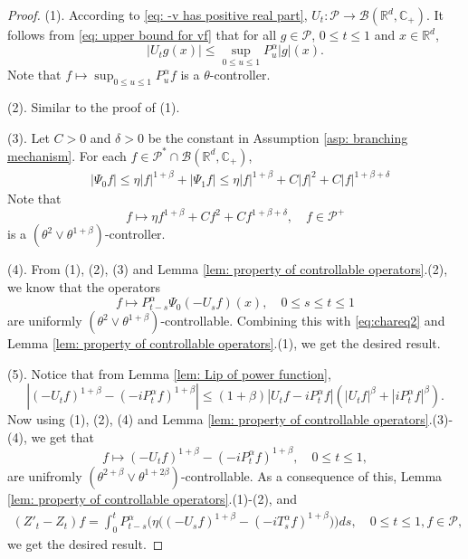 \documentclass[12pt,a4paper]{amsart}
\theoremstyle{plain}
\theoremstyle{definition}
\numberwithin{equation}{section}
\begin{document}
\begin{proof}
    (1). According to \eqref{eq: -v has positive real part}, $U_t: \mathcal P \to \mathcal B(\mathbb R^d, \mathbb C_+)$.
    It follows from \eqref{eq: upper bound for vf} that for all $g\in \mathcal P$, $0\leq t\leq 1$ and $x\in \mathbb R^d$,
\[
    |U_t g(x)|
    \leq \sup_{0\leq u\leq 1}P_u^\alpha |g| (x).
\]
    Note that $f\mapsto\sup_{0\leq u\leq 1}P^{\alpha}_u f$ is a $\theta$-controller.

    (2). Similar to the proof of (1).

    (3). Let $C>0$ and $\delta > 0$ be the constant in Assumption \ref{asp: branching mechanism}.
    For each $f\in \mathcal P^* \cap \mathcal B(\mathbb R^d, \mathbb C_+)$,
\begin{equation}\begin{split}
    &|\Psi_0 f|
    \leq \eta |f|^{1+\beta} + |\Psi_1 f|
    \leq \eta |f|^{1+\beta} + C|f|^2+ C|f|^{1+\beta + \delta}
\end{split}\end{equation}
    Note that
\[
    f \mapsto \eta f^{1+\beta} + Cf^2+ Cf^{1+\beta + \delta},\quad f\in \mathcal P^+
\]
     is a $(\theta^2 \vee \theta^{1+\beta})$-controller.

    (4). From (1), (2), (3) and Lemma \ref{lem: property of controllable operators}.(2), we know that the operators
\[
    f
    \mapsto P^\alpha_{t-s}\Psi_0(-U_sf)(x),
    \quad 0\leq s\leq t\leq 1
\]
    are uniformly $(\theta^2\vee \theta^{1+\beta})$-controllable.
    Combining this with \eqref{eq:chareq2} and Lemma \ref{lem: property of controllable operators}.(1), we get the desired result.

    (5). Notice that from Lemma \ref{lem: Lip of power function},
\[
    |(-U_t f)^{1+\beta} - (-iP^\alpha_t f)^{1+\beta} |
    \leq  (1+\beta) |U_t f-iP^\alpha_t f|(|U_t f|^{\beta}+|i P^\alpha_t f|^{\beta}).
\]
    Now using (1), (2), (4) and Lemma \ref{lem: property of controllable operators}.(3)-(4), we get that
\[
    f \mapsto (-U_t f)^{1+\beta} - (-iP^\alpha_t f)^{1+\beta},\quad 0\leq t\leq 1,
\]
    are unifromly $(\theta^{2+\beta}\vee \theta^{1+2\beta})$-controllable.
    As a consequence of this, Lemma \ref{lem: property of controllable operators}.(1)-(2), and
\begin{equation}\begin{split}
    (Z'_t - Z_t)f = \int_0^t P^\alpha_{t-s}\Big( \eta \big((-U_s f)^{1+\beta} - (-iT_s^\alpha f)^{1+\beta} \big)\Big)ds,
    \quad 0\leq t\leq 1, f\in \mathcal P,
\end{split}\end{equation}
    we get the desired result.


\end{proof}
\end{document}

